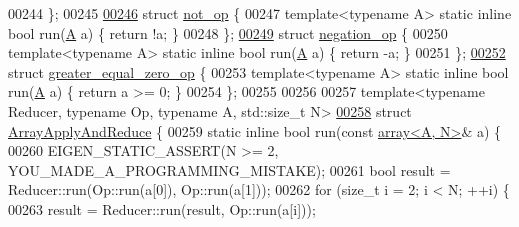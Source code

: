 \begin{DoxyCode}
00244 \};
00245 
\hyperlink{struct_eigen_1_1internal_1_1not__op}{00246} \textcolor{keyword}{struct }\hyperlink{struct_eigen_1_1internal_1_1not__op}{not\_op} \{
00247   \textcolor{keyword}{template}<\textcolor{keyword}{typename} A> \textcolor{keyword}{static} \textcolor{keyword}{inline} \textcolor{keywordtype}{bool} run(\hyperlink{group___core___module_class_eigen_1_1_matrix}{A} a) \{ \textcolor{keywordflow}{return} !a; \}
00248 \};
\hyperlink{struct_eigen_1_1internal_1_1negation__op}{00249} \textcolor{keyword}{struct }\hyperlink{struct_eigen_1_1internal_1_1negation__op}{negation\_op} \{
00250   \textcolor{keyword}{template}<\textcolor{keyword}{typename} A> \textcolor{keyword}{static} \textcolor{keyword}{inline} \textcolor{keywordtype}{bool} run(\hyperlink{group___core___module_class_eigen_1_1_matrix}{A} a) \{ \textcolor{keywordflow}{return} -a; \}
00251 \};
\hyperlink{struct_eigen_1_1internal_1_1greater__equal__zero__op}{00252} \textcolor{keyword}{struct }\hyperlink{struct_eigen_1_1internal_1_1greater__equal__zero__op}{greater\_equal\_zero\_op} \{
00253   \textcolor{keyword}{template}<\textcolor{keyword}{typename} A> \textcolor{keyword}{static} \textcolor{keyword}{inline} \textcolor{keywordtype}{bool} run(\hyperlink{group___core___module_class_eigen_1_1_matrix}{A} a) \{ \textcolor{keywordflow}{return} a >= 0; \}
00254 \};
00255 
00256 
00257 \textcolor{keyword}{template}<\textcolor{keyword}{typename} Reducer, \textcolor{keyword}{typename} Op, \textcolor{keyword}{typename} A, std::\textcolor{keywordtype}{size\_t} N>
\hyperlink{struct_eigen_1_1internal_1_1_array_apply_and_reduce}{00258} \textcolor{keyword}{struct }\hyperlink{struct_eigen_1_1internal_1_1_array_apply_and_reduce}{ArrayApplyAndReduce} \{
00259   \textcolor{keyword}{static} \textcolor{keyword}{inline} \textcolor{keywordtype}{bool} run(\textcolor{keyword}{const} \hyperlink{class_eigen_1_1array}{array<A, N>}& a) \{
00260     EIGEN\_STATIC\_ASSERT(N >= 2, YOU\_MADE\_A\_PROGRAMMING\_MISTAKE);
00261     \textcolor{keywordtype}{bool} result = Reducer::run(Op::run(a[0]), Op::run(a[1]));
00262     \textcolor{keywordflow}{for} (\textcolor{keywordtype}{size\_t} i = 2; i < N; ++i) \{
00263       result = Reducer::run(result, Op::run(a[i]));

\end{DoxyCode}
